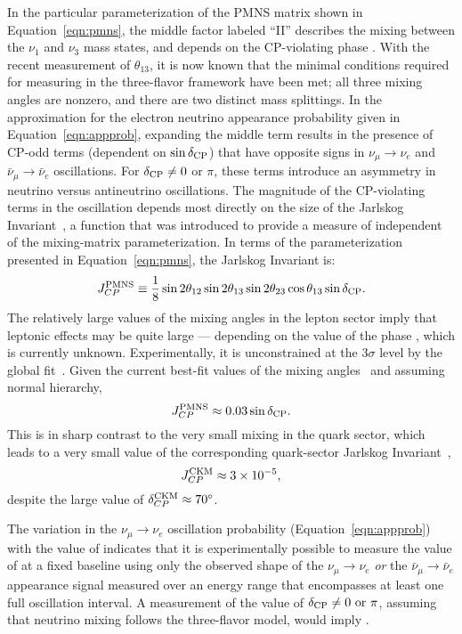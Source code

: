 In the particular parameterization of the PMNS matrix shown in
Equation~\ref{eqn:pmns}, the middle factor labeled ``II'' describes
the mixing between the $\nu_1$ and $\nu_3$ mass states, and depends on
the CP-violating phase \deltacp.  With the recent measurement of
$\theta_{13}$, it is now known that the minimal conditions required
for measuring \deltacp in the three-flavor framework have been met;
all three mixing angles are nonzero, and there are two distinct mass
splittings.  In the approximation for the electron neutrino appearance
probability given in Equation~\ref{eqn:appprob}, expanding the middle
term results in the presence of CP-odd terms (dependent on $\sin
\delta_{\rm CP}$) that have opposite signs in $\nu_{\mu} \rightarrow \nu_e$
and $\bar{\nu}_{\mu} \rightarrow \bar{\nu}_e$ oscillations.
For $\delta_{\rm CP} \neq 0$ or $\pi$, these terms introduce an asymmetry in
neutrino versus antineutrino oscillations. The magnitude of the
CP-violating terms in the oscillation depends most directly on the
size of the Jarlskog Invariant~\cite{Jarlskog:1985cw}, a function that
was introduced to provide a measure of  independent of the
mixing-matrix parameterization. In terms of the parameterization
presented in Equation~\ref{eqn:pmns}, the Jarlskog Invariant is:
%
\begin{equation}
J_{CP}^{\rm PMNS} \equiv \frac{1}{8} \sin 2 \theta_{12} \sin 2 \theta_{13}
\sin 2 \theta_{23} \cos \theta_{13} \sin \delta_{\rm CP}.
\end{equation}
The relatively large values of the mixing angles in the lepton sector imply that
leptonic  effects may be quite large ---  
depending on the value of the phase \deltacp, which is currently unknown. 
Experimentally, it is unconstrained at the 3$\sigma$ level by the global fit~\cite{Gonzalez-Garcia:2014bfa}.
Given the current best-fit values of the mixing angles~\cite{Gonzalez-Garcia:2014bfa} and assuming normal hierarchy,
\begin{equation}
J_{CP}^{\rm PMNS} \approx 0.03 \sin \delta_{\rm CP}.
\end{equation}
This is in sharp contrast to the very small mixing in the quark sector,  
which leads to a very small value of the corresponding quark-sector
Jarlskog Invariant~\cite{Beringer:1900zz},
\begin{equation}
J_{CP}^{\rm CKM} \approx 3 \times 10^{-5},
\end{equation}
despite the large value of $\delta^{\rm CKM}_{CP}\approx70^{\circ}$.

The variation in the $\nu_\mu \rightarrow
\nu_e$ oscillation probability (Equation~\ref{eqn:appprob}) with the value of \deltacp
indicates that it is experimentally possible to measure the value of
\deltacp at a fixed baseline using only the observed shape of the
$\nu_\mu \rightarrow \nu_e$ {\em or} the 
$\bar{\nu}_\mu \rightarrow \bar{\nu}_e$
appearance signal measured over an energy range that encompasses at
least one full oscillation interval. A measurement of the value of
$\delta_{\rm CP} \neq 0 \ {\rm or} \ \pi$, assuming that neutrino mixing follows the three-flavor model, would imply .  

